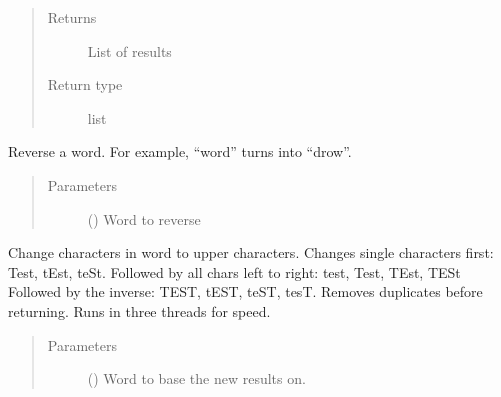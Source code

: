 \documentclass[letterpaper,10pt,english]{sphinxmanual}
\begin{document}
\begin{fulllineitems}
\begin{fulllineitems}
\begin{quote}
\begin{description}
\begin{itemize}
\end{itemize}

\item[{Returns}] \leavevmode
\sphinxAtStartPar
{} \textendash{} List of results

\item[{Return type}] \leavevmode
\sphinxAtStartPar
list

\end{description}\end{quote}

\end{fulllineitems}


\begin{fulllineitems}
\label{\detokenize{EntroPass:EntroPass.pwd_gen.Pwd_gen.reverse}}
\sphinxAtStartPar
Reverse a word. For example, “word” turns into “drow”.
\begin{quote}\begin{description}
\item[{Parameters}] \leavevmode
\sphinxAtStartPar
{} () \textendash{} Word to reverse

\end{description}\end{quote}

\end{fulllineitems}


\begin{fulllineitems}
\label{\detokenize{EntroPass:EntroPass.pwd_gen.Pwd_gen.upper_perms}}
\sphinxAtStartPar
Change characters in word to upper characters. Changes single characters first:
Test, tEst, teSt. Followed by all chars left to right: test, Test, TEst, TESt
Followed by the inverse: TEST, tEST, teST, tesT.
Removes duplicates before returning.
Runs in three threads for speed.
\begin{quote}\begin{description}
\item[{Parameters}] \leavevmode
\sphinxAtStartPar
{} () \textendash{} Word to base the new results on.


\end{description}
\end{quote}
\end{fulllineitems}
\end{fulllineitems}
\end{document}
